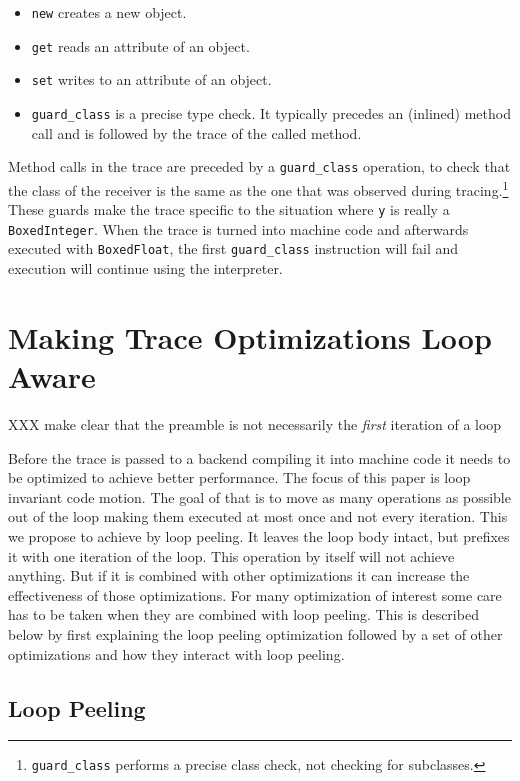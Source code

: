 \documentclass[preprint]{sigplanconf}
\begin{document}
\begin{itemize}
    \item \lstinline{new} creates a new object.
    \item \lstinline{get} reads an attribute of an object.
    \item \lstinline{set} writes to an attribute of an object.
    \item \lstinline{guard_class} is a precise type check. It typically precedes
    an (inlined) method call and is followed by the trace of the called method.
\end{itemize}

Method calls in the trace are preceded by a \lstinline{guard_class}
operation, to check that the class of the receiver is the same as the one that
was observed during tracing.\footnote{\lstinline{guard_class}
performs a precise
class check, not checking for subclasses.} These guards make the trace specific
to the situation where \lstinline{y} is really a \lstinline{BoxedInteger}. When
the trace is turned into machine code and afterwards executed with
\lstinline{BoxedFloat}, the
first \lstinline{guard_class} instruction will fail and execution will continue
using the interpreter.

\section{Making Trace Optimizations Loop Aware}

XXX make clear that the preamble is not necessarily the \emph{first} iteration
of a loop

Before the trace is passed to a backend compiling it into machine code
it needs to be optimized to achieve better performance.
The focus of this paper
is loop invariant code motion. The goal of that is to move as many
operations as possible out of the loop making them executed at most once
and not every iteration. This we propose to achieve by loop peeling. It
leaves the loop body intact, but prefixes it with one iteration of the
loop. This operation by itself will not achieve anything. But if it is
combined with other optimizations it can increase the effectiveness of
those optimizations. For many optimization of interest some care has
to be taken when they are combined with loop peeling. This is
described below by first explaining the loop peeling optimization
followed by a set of other optimizations and how they interact with
loop peeling.

\subsection{Loop Peeling}
\end{document}
